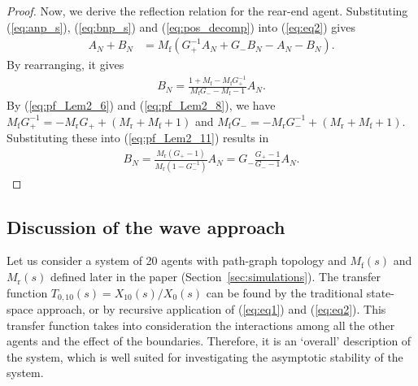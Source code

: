 \documentclass[10pt,twocolumn,twoside]{IEEEtran}
\theoremstyle{definition}
\begin{document}
\begin{proof}
Now, we derive the reflection relation for the rear-end agent. Substituting (\ref{eq:anp_s}), (\ref{eq:bnp_s}) and (\ref{eq:pos_decomp}) into (\ref{eq:eq2}) gives
\begin{align}
  A_N+B_N &= M_{\text{f}}(G_+^{-1}A_N+G_- B_N - A_N - B_N).
\end{align}
By rearranging, it gives
\begin{align}
  B_N = \frac{1+M_{\text{f}}-M_{\text{f}}G_{+}^{-1}}{M_{\text{f}}G_- -M_{\text{f}}-1} A_N.\label{eq:pf_Lem2_11}
\end{align}
By (\ref{eq:pf_Lem2_6}) and (\ref{eq:pf_Lem2_8}), we have $M_{\text{f}}G_+^{-1} = -M_{\text{r}}G_{+} + (M_{\text{r}}+M_{\text{f}}+1)$ and $M_{\text{f}}G_- = -M_{\text{r}}G_{-}^{-1}+(M_{\text{r}}+M_{\text{f}}+1)$. Substituting these into (\ref{eq:pf_Lem2_11}) results in
\begin{align}
  B_N = \frac{M_{\text{r}}(G_+ -1)}{M_{\text{r}}(1-G_-^{-1})}A_N = G_- \frac{G_+ -1}{G_- -1}A_N.
\end{align}

\end{proof}


\subsection{Discussion of the wave approach}\label{sec:wave_approach_discussion}


Let us consider a system of 20 agents with path-graph topology and $M_{\text{f}}(s)$ and $M_{\text{r}}(s)$ defined later in the paper (Section~\ref{sec:simulations}). The transfer function $T_{0,10}(s) = X_{10}(s)/X_0(s)$ can be found by the traditional state-space approach, or by recursive application of (\ref{eq:eq1}) and (\ref{eq:eq2}). This transfer function takes into consideration the interactions among all the other agents and the effect of the boundaries. Therefore, it is an `overall' description of the system, which is well suited for investigating the asymptotic stability of the system.
\end{document}
